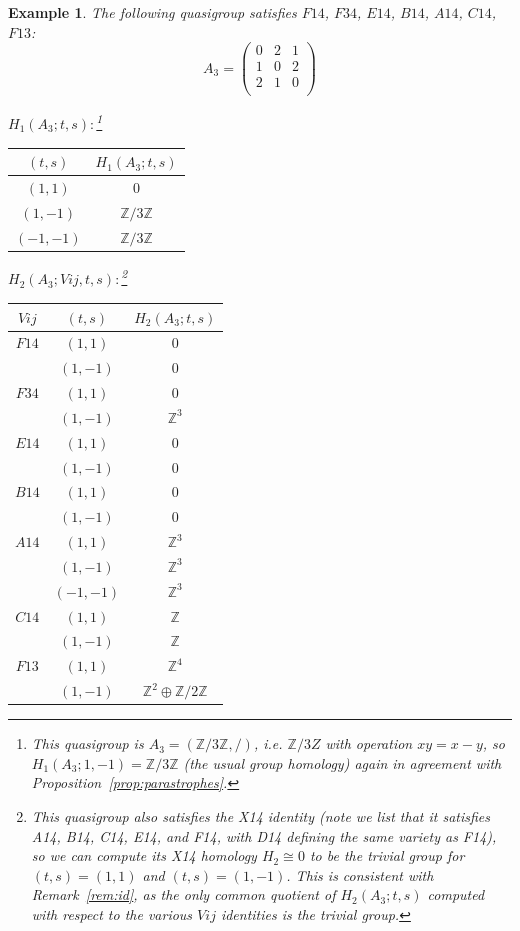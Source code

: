 \documentclass[11pt]{amsart}
\newtheorem{example}[theorem]{Example}
\theoremstyle{definition}
\newcommand{\Z}{\mathbb{Z}}
\begin{document}
\begin{example}
The following quasigroup satisfies 
$F14$, $F34$, $E14$, $B14$, $A14$, $C14$, $F13$:
   \[ A_3 = \left( \begin{array}{ccc}
 0 & 2 & 1 \\
 1 & 0 & 2 \\
 2 & 1 & 0 \\
\end{array} \right)\]


\bigskip


$H_1(A_3;t,s):$\footnote{This quasigroup is $A_3 = (\Z/3\Z, /)$, i.e. $\Z/3Z$ with operation $xy = x - y$, so $H_1(A_3;1,-1) = \Z/3\Z$ (the usual group homology) again in agreement with Proposition~\ref{prop:parastrophes}.}

\begin{center}
    
\begin{tabular}{c|c}
    $(t,s)$ & $H_1(A_3;t,s)$  \\
    \hline
    $(1,1)$ & $0$ \\
    $(1,-1)$ & $\Z/3\Z$ \\
    $(-1,-1)$ & $\Z/3\Z$ \\
\end{tabular}
\end{center}
\bigskip

$H_2(A_3;Vij,t,s):$\footnote{This quasigroup also satisfies the X14 identity (note we list that it satisfies A14, B14, C14, E14, and F14, with D14 defining the same variety as F14), so we can compute its X14 homology $H_2 \cong 0$ to be the trivial group for $(t,s) = (1,1)$ and $(t,s) = (1,-1)$. This is consistent with Remark~\ref{rem:id}, as the only common quotient of $H_2(A_3;t,s)$ computed with respect to the various $Vij$ identities is the trivial group.}

\begin{center}
    
\begin{tabular}{c|c|c}
    $Vij$ & $(t,s)$ & $H_2(A_3;t,s)$  \\
    \hline

    $F14$ & $(1,1)$ & $0$ \\
        & $(1,-1)$ & $0$ \\
    $F34$ & $(1,1)$ & $0$ \\
        & $(1,-1)$ & $\Z^3$ \\
    $E14$ & $(1,1)$ & $0$ \\
        & $(1,-1)$ & $0$ \\
    $B14$ & $(1,1)$ & $0$ \\
        & $(1,-1)$ & $0$ \\
    $A14$ & $(1,1)$ & $\Z^3$ \\
        & $(1,-1)$ & $\Z^3$ \\
        & $(-1,-1)$ & $\Z^3$ \\
    $C14$ & $(1,1)$ & $\Z$ \\
        & $(1,-1)$ & $\Z$ \\
    $F13$ & $(1,1)$ & $\Z^4$ \\
        & $(1,-1)$ & $\Z^2 \oplus \Z/2\Z$ \\
\end{tabular}


\end{center}
\end{example}
\end{document}
